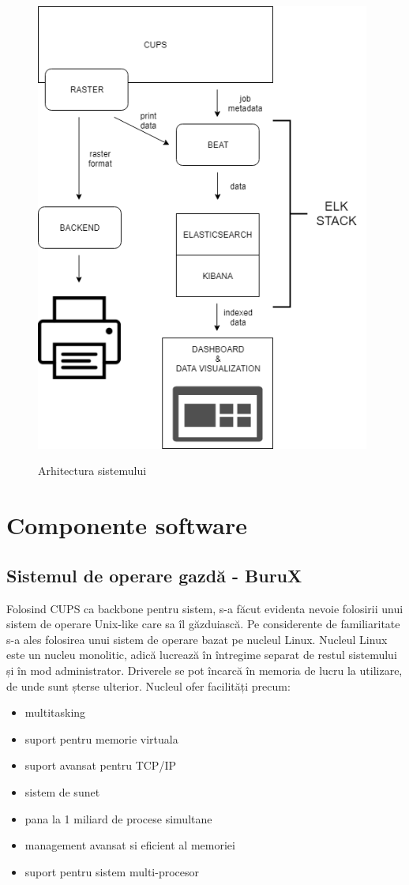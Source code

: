 \documentclass[a4paper, 12pt, twoside]{report}
\begin{document}
		\begin{figure}[h]
			\centering
				{\includegraphics[width=110mm]{cups.png}}
			\caption{Arhitectura sistemului}
		\end{figure}

	\section{Componente software}
		\subsection{Sistemul de operare gazdă - BuruX}
Folosind CUPS ca backbone pentru sistem, s-a făcut evidenta nevoie folosirii unui sistem de operare Unix-like care sa îl găzduiască. Pe considerente de familiaritate s-a ales folosirea unui sistem de operare bazat pe nucleul Linux.
Nucleul Linux este un nucleu monolitic, adică lucrează în întregime separat de restul sistemului și în mod administrator. Driverele se pot încarcă în memoria de lucru la utilizare, de unde sunt șterse ulterior. Nucleul ofer facilități precum:
\begin{itemize}
\item multitasking
\item suport pentru memorie virtuala
\item suport avansat pentru TCP/IP
\item sistem de sunet
\item pana la 1 miliard de procese simultane
\item management avansat si eficient al memoriei
\item suport pentru sistem multi-procesor
\end{itemize}
\end{document}
